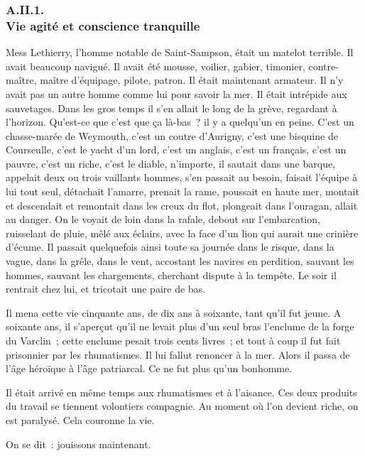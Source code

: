 \documentclass[french,twoside]{book} %
\begin{document}
  \subsubsection[{A.II.1. Vie agité et conscience tranquille}]{A.II.1. \\
Vie agité et conscience tranquille}
\noindent Mess Lethierry, l’homme notable de Saint-Sampson, était un matelot terrible. Il avait beaucoup navigué. Il avait été mousse, voilier, gabier, timonier, contre-maître, maître d’équipage, pilote, patron. Il était maintenant armateur. Il n’y avait pas un autre homme comme lui pour savoir la mer. Il était intrépide aux sauvetages. Dans les gros temps il s’en allait le long de la grève, regardant à l’horizon. Qu’est-ce que c’est que ça là-bas ? il y a quelqu’un en peine. C’est un chasse-marée de Weymouth, c’est un coutre d’Aurigny, c’est une bisquine de Courseulle, c’est le yacht d’un lord, c’est un anglais, c’est un français, c’est un pauvre, c’est un riche, c’est le diable, n’importe, il sautait dans une barque, appelait deux ou trois vaillants hommes, s’en passait au besoin, faisait l’équipe à lui tout seul, détachait l’amarre, prenait la rame, poussait en haute mer, montait et descendait et remontait dans  les creux du flot, plongeait dans l’ouragan, allait au danger. On le voyait de loin dans la rafale, debout sur l’embarcation, ruisselant de pluie, mêlé aux éclairs, avec la face d’un lion qui aurait une crinière d’écume. Il passait quelquefois ainsi toute sa journée dans le risque, dans la vague, dans la grêle, dans le vent, accostant les navires en perdition, sauvant les hommes, sauvant les chargements, cherchant dispute à la tempête. Le soir il rentrait chez lui, et tricotait une paire de bas.\par
Il mena cette vie cinquante ans, de dix ans à soixante, tant qu’il fut jeune. A soixante ans, il s’aperçut qu’il ne levait plus d’un seul bras l’enclume de la forge du Varclin ; cette enclume pesait trois cents livres ; et tout à coup il fut fait prisonnier par les rhumatismes. Il lui fallut renoncer à la mer. Alors il passa de l’âge héroïque à l’âge patriarcal. Ce ne fut plus qu’un bonhomme.\par
Il était arrivé en même temps aux rhumatismes et à l’aisance. Ces deux produits du travail se tiennent volontiers compagnie. Au moment où l’on devient riche, on est paralysé. Cela couronne la vie.\par
On se dit : jouissons maintenant.\par
\end{document}
